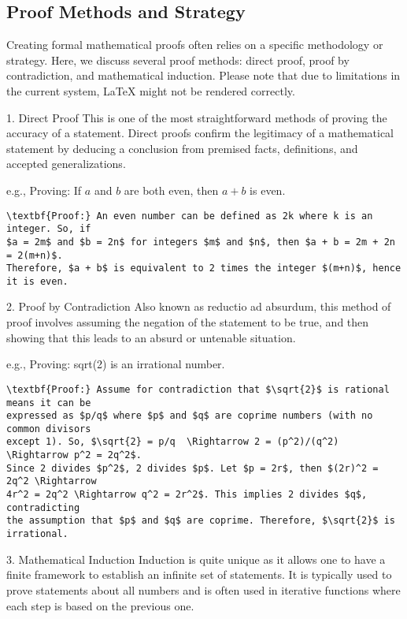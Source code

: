 \subsection{Proof Methods and Strategy}
Creating formal mathematical proofs often relies on a specific methodology or strategy. Here, we discuss several proof methods: direct proof, proof by contradiction, and mathematical induction. Please note that due to limitations in the current system, LaTeX might not be rendered correctly.

1. Direct Proof \- This is one of the most straightforward methods of proving the accuracy of a statement. Direct proofs confirm the legitimacy of a mathematical statement by deducing a conclusion from premised facts, definitions, and accepted generalizations.

e.g., Proving: If \(a\) and \(b\) are both even, then \(a + b\) is even.

\begin{verbatim}
\textbf{Proof:} An even number can be defined as 2k where k is an integer. So, if 
$a = 2m$ and $b = 2n$ for integers $m$ and $n$, then $a + b = 2m + 2n = 2(m+n)$.
Therefore, $a + b$ is equivalent to 2 times the integer $(m+n)$, hence it is even.
\end{verbatim}

2. Proof by Contradiction \- Also known as reductio ad absurdum, this method of proof involves assuming the negation of the statement to be true, and then showing that this leads to an absurd or untenable situation.

e.g., Proving: sqrt(2) is an irrational number.

\begin{verbatim}
\textbf{Proof:} Assume for contradiction that $\sqrt{2}$ is rational means it can be 
expressed as $p/q$ where $p$ and $q$ are coprime numbers (with no common divisors 
except 1). So, $\sqrt{2} = p/q  \Rightarrow 2 = (p^2)/(q^2) \Rightarrow p^2 = 2q^2$.
Since 2 divides $p^2$, 2 divides $p$. Let $p = 2r$, then $(2r)^2 = 2q^2 \Rightarrow 
4r^2 = 2q^2 \Rightarrow q^2 = 2r^2$. This implies 2 divides $q$, contradicting 
the assumption that $p$ and $q$ are coprime. Therefore, $\sqrt{2}$ is irrational.
\end{verbatim}

3. Mathematical Induction \- Induction is quite unique as it allows one to have a finite framework to establish an infinite set of statements. It is typically used to prove statements about all numbers and is often used in iterative functions where each step is based on the previous one.

